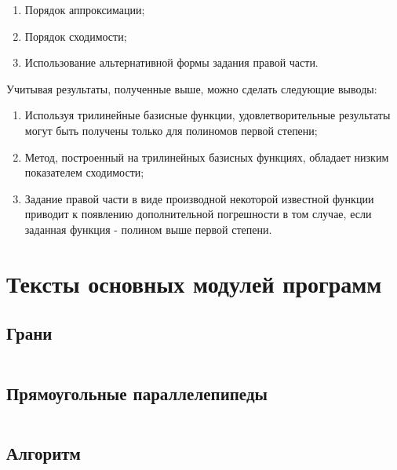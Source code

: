 \documentclass[12pt, a4paper]{article}
\begin{document}
\begin{enumerate}
  \item Порядок аппроксимации;
  \item Порядок сходимости;
  \item Использование альтернативной формы задания правой части.
\end{enumerate}

Учитывая результаты, полученные выше, можно сделать следующие выводы:

\begin{enumerate}
  \item Используя трилинейные базисные функции, удовлетворительные результаты могут быть получены только для
    полиномов первой степени;
  \item Метод, построенный на трилинейных базисных функциях, обладает низким показателем сходимости;
  \item Задание правой части в виде производной некоторой известной функции приводит к появлению дополнительной
    погрешности в том случае, если заданная функция - полином выше первой степени.
\end{enumerate}

\section{Тексты основных модулей программ}
\subsection{Грани}
\inputminted{c}{/home/mehandes/c/src/github.com/paraskun/math/pde/fem/sse/src/fce.c}

\subsection{Прямоугольные параллелепипеды}
\inputminted{c}{/home/mehandes/c/src/github.com/paraskun/math/pde/fem/sse/src/hex.c}

\subsection{Алгоритм}
\inputminted{c}{/home/mehandes/c/src/github.com/paraskun/math/pde/fem/sse/src/fem.c}
\end{document}
